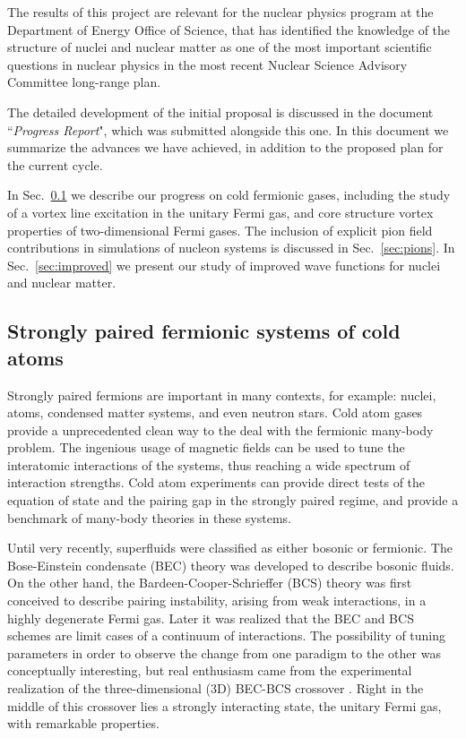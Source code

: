 \documentclass[12pt,letterpaper]{article}
\begin{document}
The results of this project are relevant for the nuclear physics program at 
the Department of Energy Office of Science, that has identified the 
knowledge of the structure of nuclei and nuclear matter as one of the most 
important scientific questions in nuclear physics in the most recent Nuclear 
Science Advisory Committee long-range plan.

The detailed development of the initial proposal is discussed 
in the document ``\textit{Progress Report}", which was submitted alongside this 
one. In this document we summarize the advances we have achieved, in addition 
to the proposed plan for the current cycle.

In Sec.~\ref{sec:cold} we describe our progress on cold fermionic gases, 
including the study of a vortex line excitation in the unitary Fermi gas, and 
core structure vortex properties of two-dimensional Fermi gases.
The inclusion of explicit pion field contributions in simulations of nucleon 
systems is discussed in Sec.~\ref{sec:pions}.
In Sec.~\ref{sec:improved} we present our study of improved wave functions for 
nuclei and nuclear matter.

\subsection{Strongly paired fermionic systems of cold atoms}
\label{sec:cold}

Strongly paired fermions are important in many contexts, for example: nuclei, 
atoms, condensed matter systems, and even neutron stars. 
Cold atom gases provide a unprecedented clean way to the deal with the 
fermionic many-body problem. The ingenious usage of magnetic fields can be used 
to tune the interatomic interactions of the systems, thus reaching a wide 
spectrum of interaction strengths.
Cold atom experiments can provide direct tests of the
equation of state and the pairing gap in the strongly
paired regime, and provide a benchmark
of many-body theories in these systems.

Until very recently, superfluids were classified as either bosonic or 
fermionic. The Bose-Einstein condensate (BEC) theory was developed to describe 
bosonic fluids. On the other hand, the Bardeen-Cooper-Schrieffer (BCS) theory 
was first conceived to describe pairing instability, arising from weak 
interactions, in a highly degenerate Fermi gas. 
Later it was realized that the BEC and BCS schemes are limit cases of a 
continuum of interactions. The possibility of tuning parameters in order to 
observe the change from one paradigm to the other was conceptually interesting, 
but real enthusiasm came from the experimental realization of the
three-dimensional (3D) BEC-BCS crossover \cite{reg04}. Right in the middle of 
this 
crossover lies a strongly interacting
state, the unitary Fermi gas, with remarkable properties.
\end{document}
